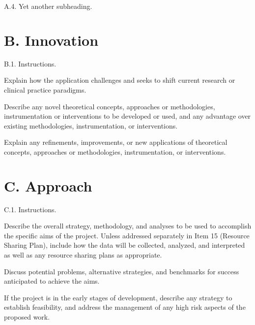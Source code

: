 \documentclass[11pt,notitlepage]{article}
\begin{document}
\lipsum[31-32]

\begin{description}
\item[A.4. Yet another subheading.]{}
\end{description}

\lipsum[55-56]


\section*{B. Innovation}

\begin{description}
\item[B.1. Instructions.]{}
\end{description}

Explain how the application challenges and seeks to shift current research or clinical practice paradigms.

Describe any novel theoretical concepts, approaches or methodologies, instrumentation or interventions to be developed or used, and any advantage over existing methodologies, instrumentation, or interventions.

Explain any refinements, improvements, or new applications of theoretical concepts, approaches or methodologies, instrumentation, or interventions.


\section*{C. Approach}

\begin{description}
\item[C.1. Instructions.]{}
\end{description}

Describe the overall strategy, methodology, and analyses to be used to accomplish the specific aims of the project. Unless addressed separately in Item 15 (Resource Sharing Plan), include how the data will be collected, analyzed, and interpreted as well as any resource sharing plans as appropriate.

Discuss potential problems, alternative strategies, and benchmarks for success anticipated to achieve the aims.

If the project is in the early stages of development, describe any strategy to establish feasibility, and address the management of any high risk aspects of the proposed work.
\end{document}
